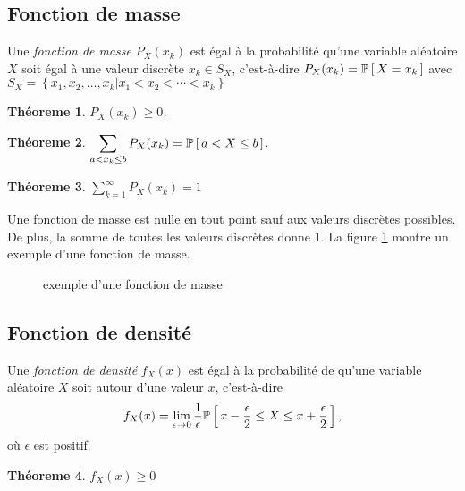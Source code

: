 \documentclass[11pt]{article}
\renewcommand\P[1]{%
	\ensuremath{%
		\mathbb{P}\left[\,#1\,\right]%
	}%
}%
\newtheorem{theoreme}{Théoreme}[section]
\begin{document}
\subsection{Fonction de masse}
\begin{definition}
	Une \textit{fonction de masse} $P_X(x_k)$ est égal à la probabilité qu'une
	variable aléatoire $X$ soit égal à une valeur discrète $x_k\in S_X$,
	c'est-à-dire $P_X(x_k)=\P{X=x_k}$ avec
	$S_X=\left\{x_1,x_2,\dots,x_k|x_1<x_2<\cdots<x_k\right\}$
\end{definition}

\begin{theoreme}
	$P_X(x_k)\geq 0$.
\end{theoreme}

\begin{theoreme}
	$\displaystyle\sum_{a< x_k\leq b}P_X(x_k)=\P{a<X\leq b}$.
\end{theoreme}

\begin{theoreme}
	$\displaystyle\sum_{k=1}^\infty P_X(x_k)=1$
\end{theoreme}

Une fonction de masse est nulle en tout point sauf aux valeurs discrètes
possibles. De plus, la somme de toutes les valeurs discrètes donne 1. La figure
\ref{fig:fonction_masse} montre un exemple d'une fonction de masse.

\begin{figure}[H]
	\centering
	\caption{exemple d'une fonction de masse}
	
	\label{fig:fonction_masse}
\end{figure}

\subsection{Fonction de densité}
\begin{definition}
	Une \textit{fonction de densité} $f_X(x)$ est égal à la probabilité de
	qu'une variable aléatoire $X$ soit autour d'une valeur $x$,
	c'est-à-dire
	\begin{equation*}
		f_X(x)=\lim_{\epsilon\rightarrow 0}\frac{1}{\epsilon}
		\P{x-\frac{\epsilon}{2}\leq X\leq x+\frac{\epsilon}{2}},
	\end{equation*}
	où $\epsilon$ est positif.
\end{definition}

\begin{theoreme}
	$f_X(x)\geq 0$
\end{theoreme}
\end{document}
